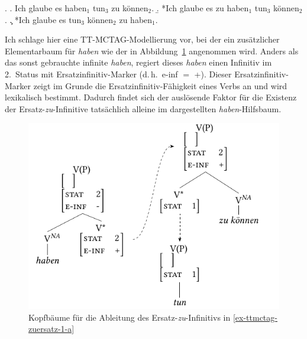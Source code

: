 \ex. \label{ex-ttmctag-zuersatz-1}
\a. Ich glaube es haben$_1$ tun$_3$ zu können$_2$. \label{ex-ttmctag-zuersatz-1-a} 
\b. *Ich glaube es zu haben$_1$ tun$_3$ können$_2$. \label{ex-ttmctag-zuersatz-1-b}
\c. *Ich glaube es tun$_3$ können$_2$ zu haben$_1$. \label{ex-ttmctag-zuersatz-1-c}

Ich schlage hier eine TT-MCTAG-Modellierung vor, bei der ein zusätzlicher Elementarbaum für {\it haben} wie der in Abbildung~\ref{fig-ttmctag-ersatzzu} angenommen wird. Anders als das sonst gebrauchte infinite  {\it haben}, regiert dieses {\it haben} einen Infinitiv im 2.~Status mit Ersatzinfinitiv-Marker (d.\,h.\ {\sc e-inf} $=$ +). Dieser Ersatzinfinitiv-Marker zeigt im Grunde die Ersatzinfinitiv-Fähigkeit eines Verbs an und wird lexikalisch bestimmt. Dadurch findet sich der auslösende Faktor für die Existenz der Ersatz-\emph{zu}-Infinitive tatsächlich alleine im dargestellten {\it haben}-Hilfsbaum.

\begin{figure}[t]
\centering
\includegraphics{graphics/abb720.pdf}
\caption{\label{fig-ttmctag-ersatzzu}Kopfbäume für die Ableitung des Ersatz-\emph{zu}-Infinitivs in \ref{ex-ttmctag-zuersatz-1-a}}
\end{figure}

